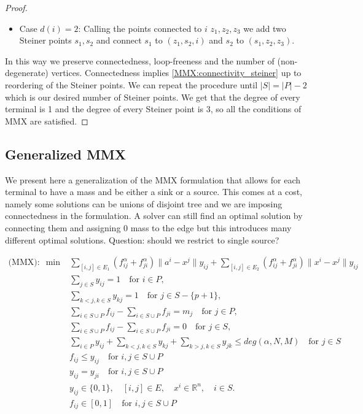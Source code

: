 \documentclass{article}
\begin{document}
\begin{proof}
\begin{itemize}
            \item Case $d(i) = 2$: Calling the points connected to $i$ $z_1, z_2, z_3$ we add two Steiner points $s_1, s_2$ and connect
            $s_1$ to $(z_1, s_2, i)$ and $s_2$ to $(s_1, z_2, z_3)$.
        \end{itemize}

        In this way we preserve connectedness, loop-freeness and the number of (non-degenerate) vertices. Connectedness implies
        \ref{MMX:connectivity_steiner} up to reordering of the Steiner points.
        We can repeat the procedure until $|S| = |P| - 2$ which is our desired number of Steiner points.
        We get that the degree of every terminal is 1 and the degree of every Steiner point is 3, so all the conditions
        of MMX are satisfied.


    \end{proof}

    \subsection{Generalized MMX}

    We present here a generalization of the MMX formulation that allows for each terminal to have a mass and be either a
    sink or a source. This comes at a cost, namely some solutions can be unions of disjoint tree and we are imposing connectedness
    in the formulation. A solver can still find an optimal solution by connecting them and assigning $0$ mass to the edge
    but this introduces many different optimal solutions. Question: should we restrict to single source?

    \begin{align}
        \text{(MMX)}: \; \min &\sum_{[i,j] \in E_1} (f^{\alpha}_{ij} + f^{\alpha}_{ji})\|a^i - x^j\| y_{ij} + \sum_{[i,j] \in E_2} (f^{\alpha}_{ij} + f^{\alpha}_{ji})\|x^i - x^j\| y_{ij} \\
        & \sum_{j \in S} y_{ij} = 1 \quad \text{for } i \in P, \\
        & \sum_{k < j, k \in S} y_{kj} = 1 \quad \text{for } j \in S - \{p+1\},  \\
        & \sum_{i \in S \cup P} f_{ij} - \sum_{i \in S \cup P} f_{ji} = m_j \quad \text{for } j \in P, \\
        & \sum_{i \in S \cup P} f_{ij} - \sum_{i \in S \cup P} f_{ji} = 0 \quad \text{for } j \in S, \\
        & \sum_{i \in P} y_{ij} + \sum_{k < j, k \in S} y_{kj} + \sum_{k > j, k \in S} y_{jk} \le deg(\alpha, N, M) \quad \text{for } j \in S \\
        & f_{ij} \le y_{ij} \quad \text{for } i,j \in S \cup P \\
        & y_{ij} = y_{ji} \quad \text{for } i,j \in S \cup P \\
        & y_{ij} \in \{0, 1\}, \quad [i, j] \in E, \quad x^i \in \mathbb{R}^n, \quad i \in S. \\
        & f_{ij} \in [0,1] \quad \text{for } i,j \in S \cup P\\
    \end{align}
\end{document}
